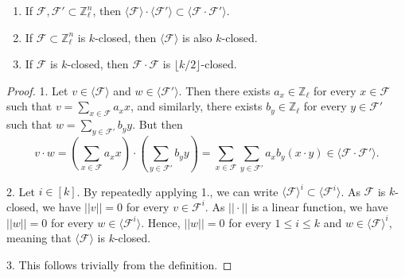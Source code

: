 	\begin{claim}\label{claim:k-closed}
		\begin{enumerate}
			
			\item  If $\mathcal{F},\mathcal{F}'\subset \mathbb{Z}_{\ell}^{n}$, then $\langle \mathcal{F}\rangle\cdot \langle \mathcal{F}'\rangle\subset \langle \mathcal{F}\cdot\mathcal{F}'\rangle$.
			
			\item 	If $\mathcal{F}\subset \mathbb{Z}_{\ell}^{n}$ is $k$-closed, then $\langle \mathcal{F}\rangle$ is also $k$-closed.
			
			\item If $\mathcal{F}$ is $k$-closed, then $\mathcal{F}\cdot\mathcal{F}$ is $\lfloor k/2\rfloor$-closed.
		\end{enumerate}
	\end{claim}
	
	\begin{proof}
		1. Let $v\in\langle\mathcal{F}\rangle$ and $w\in\langle\mathcal{F}'\rangle$. Then there exists $a_x\in\mathbb{Z}_{\ell}$ for every $x\in\mathcal{F}$ such that $v=\sum_{x\in\mathcal{F}}a_x x$, and similarly, there exists $b_y\in\mathbb{Z}_{\ell}$ for every $y\in\mathcal{F}'$  such that $w=\sum_{y\in\mathcal{F}'}b_y y$. But then
		$$v\cdot w=\left(\sum_{x\in \mathcal{F}}a_x x\right)\cdot \left(\sum_{y\in\mathcal{F}'}b_y y\right)=\sum_{x\in\mathcal{F}}\sum_{y\in\mathcal{F}'}a_xb_y(x\cdot y)\in \langle \mathcal{F}\cdot\mathcal{F}'\rangle.$$
		
		2. Let $i\in [k]$. By repeatedly applying 1., we can write $\langle\mathcal{F}\rangle^{i}\subset \langle \mathcal{F}^{i}\rangle$.
		As $\mathcal{F}$ is $k$-closed, we have $||v||=0$ for every $v\in\mathcal{F}^{i}$. 
		As $|| \cdot ||$ is a linear function,
%
		we have $||w||=0$ for every $w\in \langle \mathcal{F}^{i}\rangle$. Hence, $||w||=0$ for every $1\leq i\leq k$ and $w\in \langle \mathcal{F}\rangle^{i}$, meaning that $\langle \mathcal{F}\rangle$ is $k$-closed.
		
		3. This follows trivially from the definition.
	\end{proof}
	
